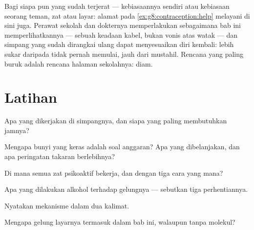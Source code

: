 \begin{example}\label{ex:g8:protecting-the-nervous-system:help}
Bagi siapa pun yang sudah terjerat --- kebiasaannya sendiri
atau kebiasaan seorang teman, zat atau layar: alamat pada
\cref{ex:g8:contraception:help} melayani di sini juga.
Perawat sekolah dan dokternya memperlakukan 
sebagaimana bab ini memperlihatkannya --- sebuah keadaan
kabel, bukan vonis atas watak --- dan simpang yang sudah
dirangkai ulang dapat menyesuaikan diri kembali: lebih sukar
daripada tidak pernah memulai, jauh dari mustahil. Rencana
yang paling buruk adalah rencana halaman sekolahnya: diam.
\end{example}

\section{Latihan}

\begin{exercise}[$\star$]\label{exo:g8:protecting-the-nervous-system:1}
Apa yang dikerjakan  di simpangnya, dan siapa yang
paling membutuhkan jamnya?
\end{exercise}

\begin{exercise}[$\star$]\label{exo:g8:protecting-the-nervous-system:2}
Mengapa bunyi yang keras adalah soal anggaran? Apa yang
dibelanjakan, dan apa peringatan takaran berlebihnya?
\end{exercise}

\begin{exercise}[$\star$]\label{exo:g8:protecting-the-nervous-system:3}
Di mana semua zat psikoaktif bekerja, dan dengan tiga cara
yang mana?
\end{exercise}

\begin{exercise}[$\star$]\label{exo:g8:protecting-the-nervous-system:4}
Apa yang dilakukan alkohol terhadap gelungnya --- sebutkan
tiga perhentiannya.
\end{exercise}

\begin{exercise}[$\star$]\label{exo:g8:protecting-the-nervous-system:5}
Nyatakan mekanisme  dalam dua kalimat.
\end{exercise}

\begin{exercise}[$\star$]\label{exo:g8:protecting-the-nervous-system:6}
Mengapa gelung layarnya termasuk dalam bab ini, walaupun
tanpa molekul?
\end{exercise}

